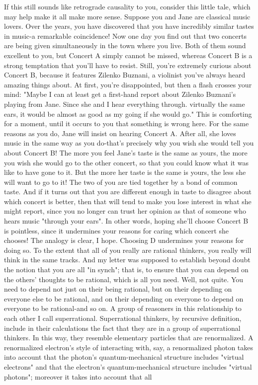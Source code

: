         If this still sounds like retrograde causality to you, consider this little tale,
which may help make it all make more sense. Suppose you and Jane are classical
music lovers. Over the years, you have discovered that you have incredibly similar
tastes in music-a remarkable coincidence! Now one day you find out that two concerts
are being given simultaneously in the town where you live. Both of them sound
excellent to you, but Concert A simply cannot be missed, whereas Concert B is a
strong temptation that you'll have to resist. Still, you're extremely curious about
Concert B, because it features Zilenko Buznani, a violinist you've always heard
amazing things about.
        At first, you're disappointed, but then a flash crosses your mind: "Maybe I can
at least get a first-hand report about Zilenko Buznani's playing from Jane. Since she
and I hear everything through. virtually the same ears, it would be almost as good as
my going if she would go." This is comforting for a moment, until it occurs to you
that something is wrong here. For the same reasons as you do, Jane will insist on
hearing Concert A. After all, she loves music in the same way as you do-that's
precisely why you wish she would tell you about Concert B! The more you feel Jane's
taste is the same as yours, the more you wish she would go to the other concert, so
that you could know what it was like to have gone to it. But the more her taste is the
same is yours, the less she will want to go to it!
        The two of you are tied together by a bond of common taste. And if it turns
out that you are different enough in taste to disagree about which concert is better,
then that will tend to make you lose interest in what she might report, since you no
longer can trust her opinion as that of someone who hears music "through your ears".
In other words, hoping she'll choose Concert B is pointless, since it undermines your
reasons for caring which concert she chooses!
        The analogy is clear, I hope. Choosing D undermines your reasons for doing
so. To the extent that all of you really are rational thinkers, you really will think in the
same tracks. And my letter was supposed to establish beyond doubt the notion that
you are all "in synch"; that is, to ensure that you can depend on the others' thoughts to
be rational, which is all you need.
        Well, not quite. You need to depend not just on their being rational, but on
their depending on everyone else to be rational, and on their depending on everyone
to depend on everyone to be rational-and so on. A group of reasoners in this
relationship to each other I call superrational. Superrational thinkers, by recursive
definition, include in their calculations the fact that they are in a group of
superrational thinkers. In this way, they resemble elementary particles that are
renormalized.
        A renormalized electron's style of interacting with, say, a renormalized photon
takes into account that the photon's quantum-mechanical structure includes "virtual
electrons" and that the electron's quantum-mechanical structure includes "virtual
photons"; moreover it takes into account that all




